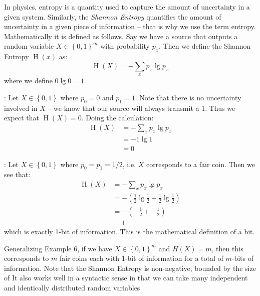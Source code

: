 \documentclass[11pt]{article}
\newcommand{\set}[1]{\left\{ #1 \right\}}
\newcommand{\se}{\operatorname{H}}
\newcommand{\Example}[1]{{\bf Example #1}:}
\def\fill{   \hfill}
\begin{document}
\fill

\noindent In physics, entropy is a quantity used to capture the amount of uncertainty in a given system. Similarly, the \emph{Shannon Entropy} quantifies the amount of uncertainty in a given piece of information -- that is why we use the term entropy. Mathematically it is defined as follows. Say we have a source that outputs a random variable $X \in \set{0, 1}^m$ with probability $p_x$. Then we define the Shannon Entropy $\se(x)$ as:
\begin{equation} \label{eq:def-se}
\se(X) = -\sum_{x} p_x \lg{p_x}
\end{equation}
where we define $0\lg{0} = 1$.

\fill

\noindent \Example{5} Let $X \in \set{0, 1}$ where $p_0 = 0$ and $p_1 = 1$. Note that there is no uncertainty involved in $X$ -- we know that our source will always transmit a $1$. Thus we expect that $\se(X) = 0$. Doing the calculation:
\begin{align*}
\se(X) 
&= -\sum_{x} p_x \lg{p_x} \\
&= -1\lg{1} \\
&= 0 
\end{align*}

\fill

\noindent \Example{6} Let $X \in \set{0, 1}$ where $p_0 = p_1 = 1/2$, i.e. $X$ corresponds to a fair coin. Then we see that:
\begin{align*}
\se(X) 
&= -\sum_{x} p_x \lg{p_x} \\
&= -\left(
\frac{1}{2}\lg{\frac{1}{2}} + \frac{1}{2}\lg{\frac{1}{2}}
\right) \\
&= -(-\frac{1}{2} + -\frac{1}{2}) \\
&= 1
\end{align*}
which is exactly 1-bit of information. This is the mathematical definition of a bit.

\fill

\noindent Generalizing Example 6, if we have $X \in \set{0, 1}^m$ and $H(X) = m$, then this corresponds to $m$ fair coins each with 1-bit of information for a total of $m$-bits of information. Note that the Shannon Entropy is non-negative, bounded by the size of %
It also works well in a syntactic sense in that we can take many independent and identically distributed random variables %
\end{document}
